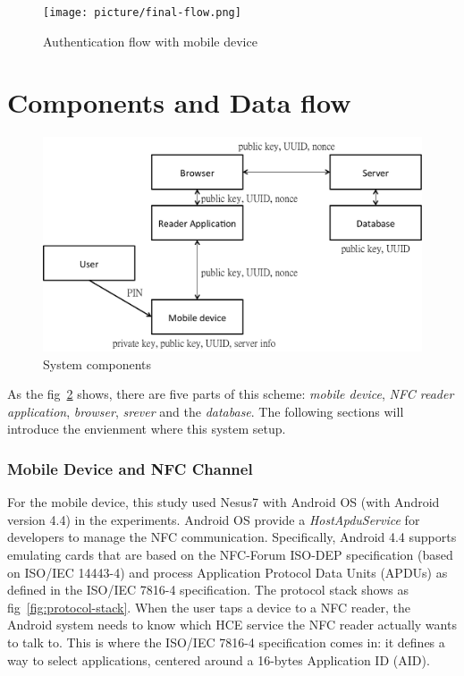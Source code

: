 \begin{CJK}{Bg5}{bsmi}
\begin{figure}
\centering
\texttt{[image: picture/final-flow.png]}
\caption{Authentication flow with mobile device}
\label{fig:final-flow}
\end{figure}

\section{Components and Data flow}

\begin{figure}
\centering
\includegraphics[scale=0.45]{picture/system-component.png}
\caption{System components}
\label{fig:system-component}
\end{figure}

As the fig~\ref{fig:system-component} shows, there are five parts of this scheme: \emph{mobile device}, \emph{NFC reader application}, \emph{browser}, \emph{srever} and the \emph{database}. The following sections will introduce the envienment where this system setup.

\subsubsection{Mobile Device and NFC Channel}

For the mobile device, this study used Nesus7 with Android OS (with Android version 4.4) in the experiments. Android OS provide a \emph{HostApduService}\cite{hce} for developers to manage the NFC communication. Specifically, Android 4.4 supports emulating cards that are based on the NFC-Forum ISO-DEP specification (based on ISO/IEC 14443-4) and process Application Protocol Data Units (APDUs) as defined in the ISO/IEC 7816-4 specification. The protocol stack shows as fig~\ref{fig:protocol-stack}. When the user taps a device to a NFC reader, the Android system needs to know which HCE service the NFC reader actually wants to talk to. This is where the ISO/IEC 7816-4 specification comes in: it defines a way to select applications, centered around a 16-bytes Application ID (AID).


\end{CJK}

